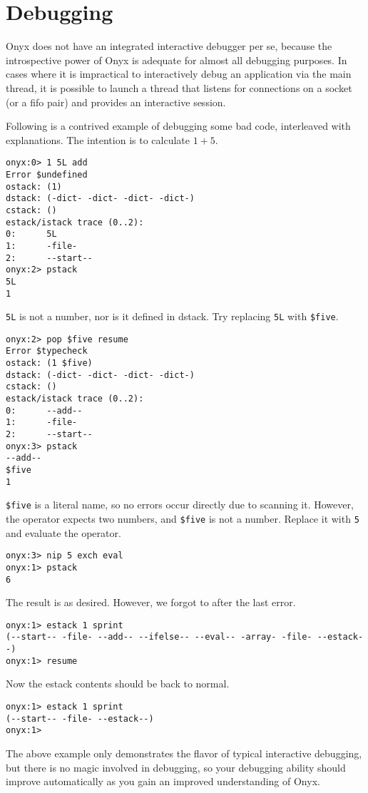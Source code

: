 \section{Debugging}

Onyx does not have an integrated interactive debugger per se, because the
introspective power of Onyx is adequate for almost all debugging purposes.  In
cases where it is impractical to interactively debug an application via the main
thread, it is possible to launch a thread that listens for connections on a
socket (or a fifo pair) and provides an interactive session.

Following is a contrived example of debugging some bad code, interleaved with
explanations.  The intention is to calculate $1 + 5$.

\begin{verbatim}
onyx:0> 1 5L add
Error $undefined
ostack: (1)
dstack: (-dict- -dict- -dict- -dict-)
cstack: ()
estack/istack trace (0..2):
0:      5L
1:      -file-
2:      --start--
onyx:2> pstack
5L
1
\end{verbatim}

{\tt 5L} is not a number, nor is it defined in dstack.  Try replacing {\tt 5L}
with {\tt \$five}.

\begin{verbatim}
onyx:2> pop $five resume
Error $typecheck
ostack: (1 $five)
dstack: (-dict- -dict- -dict- -dict-)
cstack: ()
estack/istack trace (0..2):
0:      --add--
1:      -file-
2:      --start--
onyx:3> pstack
--add--
$five
1
\end{verbatim}

{\tt \$five} is a literal name, so no errors occur directly due to scanning it.
However, the  operator expects two
numbers, and {\tt \$five} is not a number.  Replace it with {\tt 5} and evaluate
the operator.

\begin{verbatim}
onyx:3> nip 5 exch eval
onyx:1> pstack
6
\end{verbatim}

The result is as desired.  However, we forgot to
 after the last error.

\begin{verbatim}
onyx:1> estack 1 sprint
(--start-- -file- --add-- --ifelse-- --eval-- -array- -file- --estack--)
onyx:1> resume
\end{verbatim}

Now the estack contents should be back to normal.

\begin{verbatim}
onyx:1> estack 1 sprint
(--start-- -file- --estack--)
onyx:1>
\end{verbatim}

The above example only demonstrates the flavor of typical interactive debugging,
but there is no magic involved in debugging, so your debugging ability should
improve automatically as you gain an improved understanding of Onyx.
